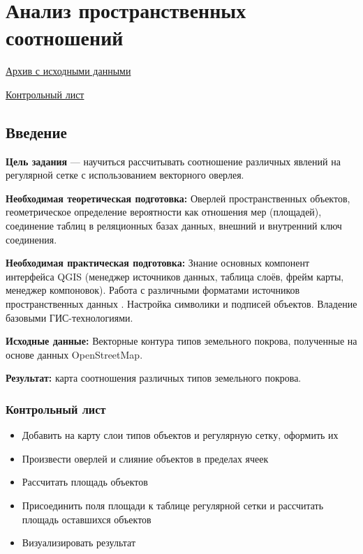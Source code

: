 \documentclass[
  12pt,
]{book}
\providecommand{\tightlist}{%
  \setlength{\itemsep}{0pt}\setlength{\parskip}{0pt}}
\begin{document}
\hypertarget{spatrelations}{%
\chapter{Анализ пространственных соотношений}\label{spatrelations}}

\href{https://github.com/aentin/qgis-course/raw/master/files/Ex08.zip}{Архив с исходными данными}

\href{https://github.com/aentin/qgis-course/raw/master/files/Ex08_\%D0\%BE\%D1\%82\%D1\%87\%D1\%91\%D1\%82.docx}{Контрольный лист}

\hypertarget{spatrelations-intro}{%
\section{Введение}\label{spatrelations-intro}}

\textbf{Цель задания} --- научиться рассчитывать соотношение различных явлений на регулярной сетке с использованием векторного оверлея.

\textbf{Необходимая теоретическая подготовка:} Оверлей пространственных объектов, геометрическое определение вероятности как отношения мер (площадей), соединение таблиц в реляционных базах данных, внешний и внутренний ключ соединения.

\textbf{Необходимая практическая подготовка:} Знание основных компонент интерфейса QGIS (менеджер источников данных, таблица слоёв, фрейм карты, менеджер компоновок). Работа с различными форматами источников пространственных данных . Настройка символики и подписей объектов. Владение базовыми ГИС-технологиями.

\textbf{Исходные данные:} Векторные контура типов земельного покрова, полученные на основе данных OpenStreetMap.

\textbf{Результат:} карта соотношения различных типов земельного покрова.

\hypertarget{spatrelations-control}{%
\subsection{Контрольный лист}\label{spatrelations-control}}

\begin{itemize}
\tightlist
\item
  Добавить на карту слои типов объектов и регулярную сетку, оформить их
\item
  Произвести оверлей и слияние объектов в пределах ячеек
\item
  Рассчитать площадь объектов
\item
  Присоединить поля площади к таблице регулярной сетки и рассчитать площадь оставшихся объектов
\item
  Визуализировать результат
\end{itemize}
\end{document}
